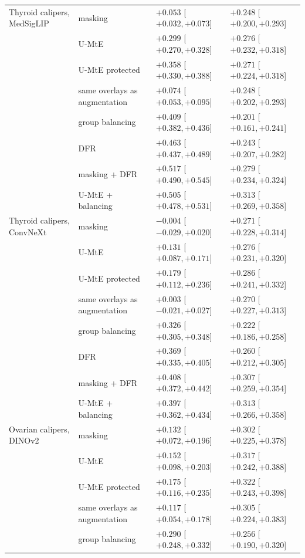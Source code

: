 {\begin{longtable}{p{3.4cm}p{4.2cm}p{3.5cm}p{3.5cm}}
Thyroid calipers, MedSigLIP & masking & $+0.053$ [$+0.032, +0.073$] & $+0.248$ [$+0.200, +0.293$] \\
 & U-MtE & $+0.299$ [$+0.270, +0.328$] & $+0.276$ [$+0.232, +0.318$] \\
 & U-MtE protected & $+0.358$ [$+0.330, +0.388$] & $+0.271$ [$+0.224, +0.318$] \\
 & same overlays as augmentation & $+0.074$ [$+0.053, +0.095$] & $+0.248$ [$+0.202, +0.293$] \\
 & group balancing & $+0.409$ [$+0.382, +0.436$] & $+0.201$ [$+0.161, +0.241$] \\
 & DFR & $+0.463$ [$+0.437, +0.489$] & $+0.243$ [$+0.207, +0.282$] \\
 & masking + DFR & $+0.517$ [$+0.490, +0.545$] & $+0.279$ [$+0.234, +0.324$] \\
 & U-MtE + balancing & $+0.505$ [$+0.478, +0.531$] & $+0.313$ [$+0.269, +0.358$] \\
Thyroid calipers, ConvNeXt & masking & $-0.004$ [$-0.029, +0.020$] & $+0.271$ [$+0.228, +0.314$] \\
 & U-MtE & $+0.131$ [$+0.087, +0.171$] & $+0.276$ [$+0.231, +0.320$] \\
 & U-MtE protected & $+0.179$ [$+0.112, +0.236$] & $+0.286$ [$+0.241, +0.332$] \\
 & same overlays as augmentation & $+0.003$ [$-0.021, +0.027$] & $+0.270$ [$+0.227, +0.313$] \\
 & group balancing & $+0.326$ [$+0.305, +0.348$] & $+0.222$ [$+0.186, +0.258$] \\
 & DFR & $+0.369$ [$+0.335, +0.405$] & $+0.260$ [$+0.212, +0.305$] \\
 & masking + DFR & $+0.408$ [$+0.372, +0.442$] & $+0.307$ [$+0.259, +0.354$] \\
 & U-MtE + balancing & $+0.397$ [$+0.362, +0.434$] & $+0.313$ [$+0.266, +0.358$] \\
Ovarian calipers, DINOv2 & masking & $+0.132$ [$+0.072, +0.196$] & $+0.302$ [$+0.225, +0.378$] \\
 & U-MtE & $+0.152$ [$+0.098, +0.203$] & $+0.317$ [$+0.242, +0.388$] \\
 & U-MtE protected & $+0.175$ [$+0.116, +0.235$] & $+0.322$ [$+0.243, +0.398$] \\
 & same overlays as augmentation & $+0.117$ [$+0.054, +0.178$] & $+0.305$ [$+0.224, +0.383$] \\
 & group balancing & $+0.290$ [$+0.248, +0.332$] & $+0.256$ [$+0.190, +0.320$] \\

\end{longtable}}
